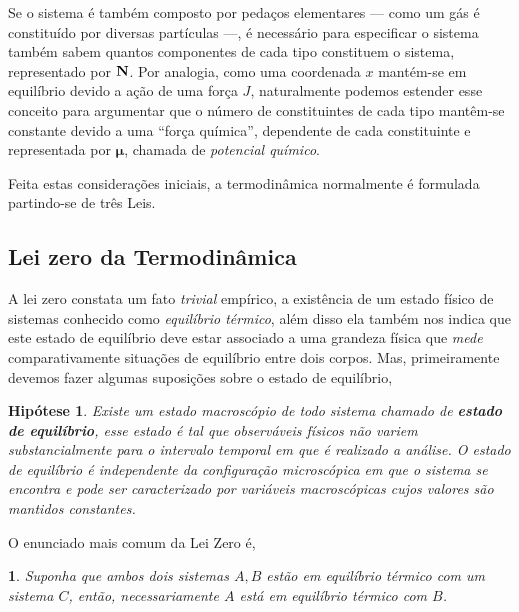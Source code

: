 \documentclass[twoside]{amsart}
\numberwithin{equation}{section}
\newtheorem{hipotese}{Hipótese}[section]
\newcommand{\thistheoremname}{}
\newtheorem*{genericthm}{\thistheoremname}
\newenvironment{namedthm}[1]
  {\renewcommand{\thistheoremname}{#1}
   \begin{genericthm}}
  {\end{genericthm}}
\begin{document}
\begin{refsection}
Se o sistema é também composto por pedaços elementares --- como um gás é constituído por diversas partículas 
---, é necessário para especificar o sistema também sabem quantos componentes de cada tipo constituem o 
sistema, representado por $\vb N$. Por analogia, como uma coordenada $x$ mantém-se em equilíbrio devido a 
ação de uma força $J$, naturalmente podemos estender esse conceito para argumentar que o número de 
constituintes de cada tipo mantêm-se constante devido a uma ``força química'', dependente de cada 
constituinte e representada por $\boldsymbol \mu$, chamada de \emph{potencial químico}.

Feita estas considerações iniciais, a termodinâmica normalmente é formulada partindo-se de três Leis.

\subsection{Lei zero da Termodinâmica}

A lei zero constata um fato \emph{trivial} empírico, a existência de um estado físico de sistemas conhecido 
como \emph{equilíbrio térmico}, além disso ela também nos indica que este estado de equilíbrio deve estar 
associado a uma grandeza física que \emph{mede} comparativamente situações de equilíbrio entre dois corpos. Mas, primeiramente devemos fazer algumas suposições sobre o estado de equilíbrio,

\begin{hipotese}
    Existe um estado macroscópio de todo sistema chamado de \textbf{estado de equilíbrio}, 
    esse estado é tal que observáveis físicos não variem substancialmente para o intervalo 
    temporal em que é realizado a análise. O estado de equilíbrio é independente da 
    configuração microscópica em que o sistema se encontra e pode ser caracterizado por 
    variáveis macroscópicas cujos valores são mantidos constantes.
\end{hipotese}

O enunciado mais comum da Lei Zero é,

\begin{namedthm}{Lei Zero}
    Suponha que ambos dois sistemas $A,B$ estão em equilíbrio térmico com um sistema $C$, então, necessariamente 
    $A$ está em equilíbrio térmico com $B$.
\end{namedthm}


\end{refsection}
\end{document}
